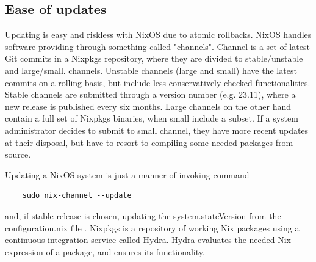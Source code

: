 \subsection{Ease of updates}

Updating is easy and riskless with NixOS due to atomic rollbacks. NixOS handles software providing through something called "channels". Channel is a set of latest Git commits in a Nixpkgs repository, where they are divided to stable/unstable  and large/small. channels. Unstable channels (large and small) have the latest commits on a rolling basis, but include less conservatively checked functionalities. Stable channels are submitted through a version number (e.g. 23.11), where a new release is published every six months. Large channels on the other hand contain a full set of Nixpkgs binaries, when small include a subset. If a system administrator decides to submit to small channel, they have more recent updates at their disposal, but have to resort to compiling some needed packages from source. \cite{nixosChannelsNixOS}

Updating a NixOS system is just a manner of invoking command

\begin{lstlisting}
    sudo nix-channel --update
\end{lstlisting}

and, if stable release is chosen, updating the system.stateVersion from the configuration.nix file \cite{nixosNixOSManual}. Nixpkgs is a repository of working Nix packages using a continuous integration service called Hydra. Hydra evaluates the needed Nix expression of a package, and ensures its functionality. \cite{nixosNixOSManual}






